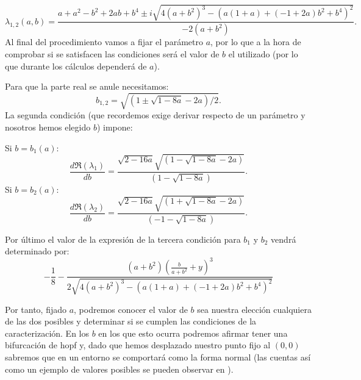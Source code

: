 \[ \lambda_{1,2}(a,b)=\frac{a+a^2-b^2+2ab+b^4\pm i \sqrt{4(a+b^2)^3-(a(1+a)+(-1+2a)b^2+b^4)^2}}{-2(a+b^2)}.\]
Al final del procedimiento vamos a fijar el parámetro $a$, por lo que a la hora de comprobar si se satisfacen las condiciones será el valor de $b$ el utilizado (por lo que durante los cálculos dependerá de $a$).

Para que la parte real se anule necesitamos:
\[ b_{1,2}=\sqrt{(1\pm\sqrt{1-8a}-2a)/2} .\]
La segunda condición (que recordemos exige derivar respecto de un parámetro y nosotros hemos elegido $b$) impone:

Si $b=b_1(a)$:
\[ \frac{d\Re(\lambda_1)}{db}=\frac{\sqrt{2-16a}\sqrt{(1-\sqrt{1-8a}-2a)}}{(1-\sqrt{1-8a})}. \]
Si $b=b_2(a)$:
\[\frac{d\Re(\lambda_2)}{db}=\frac{\sqrt{2-16a}\sqrt{(1+\sqrt{1-8a}-2a)}}{(-1-\sqrt{1-8a})}.\]

Por último el valor de la expresión de la tercera condición para $b_1$ y $b_2$ vendrá determinado por:
\[-\frac{1}{8}-\frac{(a+b^2)(\frac{b}{a+b^2}+y)^3}{2\sqrt{4(a+b^2)^3-(a(1+a)+(-1+2a)b^2+b^4)^2}}\]

Por tanto, fijado $a$, podremos conocer el valor de $b$ sea nuestra elección cualquiera de las dos posibles y determinar si se cumplen las condiciones de la caracterización. En los $b$ en los que esto ocurra podremos afirmar tener una bifurcación de hopf y, dado que hemos desplazado nuestro punto fijo al $(0,0)$ sabremos que en un entorno se comportará como la forma normal (las cuentas así como un ejemplo de valores posibles se pueden observar en \cite{student}).




